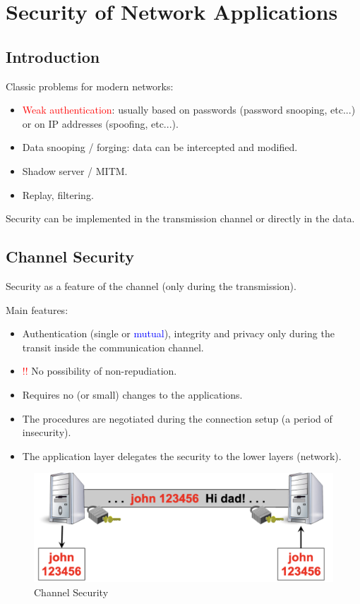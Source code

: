 \chapter{Security of Network Applications}

\cite{06_appsec}
\section*{Introduction}
Classic problems for modern networks:
\begin{itemize}
    \item \textcolor{Red}{Weak authentication}: usually based on passwords (password snooping, etc...) or on IP addresses (spoofing, etc...). 
    \item Data snooping / forging: data can be intercepted and modified.
    \item Shadow server / MITM.
    \item Replay, filtering. 
\end{itemize}

Security can be implemented in the transmission channel or directly in the data.

\section{Channel Security}
\begin{center}
    Security as a feature of the channel (only during the transmission).
\end{center}
Main features:
\begin{itemize}
    \item Authentication (single or \textcolor{Blue}{mutual}), integrity and privacy only during the transit inside the communication channel.
    \item \textcolor{Red}{!!} No possibility of non-repudiation.
    \item Requires no (or small) changes to the applications.
    \item The procedures are negotiated during the connection setup (a period of insecurity).
    \item The application layer delegates the security to the lower layers (network).
\end{itemize}

\begin{figure}[H]
    \centering
    \includegraphics[width=0.8\linewidth]{Images/Appsec/channel_security.png}
    \caption{Channel Security}
\end{figure}

